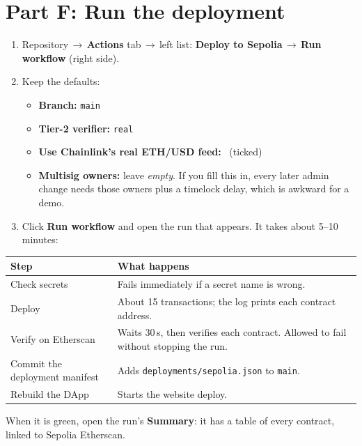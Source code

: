\documentclass[11pt,a4paper]{article}
\newcommand{\ui}[1]{\textsf{\textbf{#1}}}
\newcommand{\code}[1]{\texttt{#1}}
\newcommand{\arr}{\,$\rightarrow$\,}
\begin{document}
\section{Part F: Run the deployment}
\begin{enumerate}
  \item Repository\arr\ui{Actions} tab\arr left list: \ui{Deploy to Sepolia}\arr\ui{Run workflow} (right side).
  \item Keep the defaults:
  \begin{itemize}
    \item \textbf{Branch:} \code{main}
    \item \textbf{Tier-2 verifier:} \code{real}
    \item \textbf{Use Chainlink's real ETH/USD feed:} \faCheckSquare\ (ticked)
    \item \textbf{Multisig owners:} leave \emph{empty}. If you fill this in, every later admin change needs those owners plus a timelock delay, which is awkward for a demo.
  \end{itemize}
  \item Click \ui{Run workflow} and open the run that appears. It takes about 5--10 minutes:
\end{enumerate}
\begin{center}
\begin{tabularx}{0.95\textwidth}{@{}lX@{}}
\toprule
\textbf{Step} & \textbf{What happens} \\
\midrule
Check secrets & Fails immediately if a secret name is wrong. \\
Deploy & About 15 transactions; the log prints each contract address. \\
Verify on Etherscan & Waits 30\,s, then verifies each contract. Allowed to fail without stopping the run. \\
Commit the deployment manifest & Adds \code{deployments/sepolia.json} to \code{main}. \\
Rebuild the DApp & Starts the website deploy. \\
\bottomrule
\end{tabularx}
\end{center}
When it is green, open the run's \ui{Summary}: it has a table of every contract, linked to Sepolia Etherscan.
\end{document}
